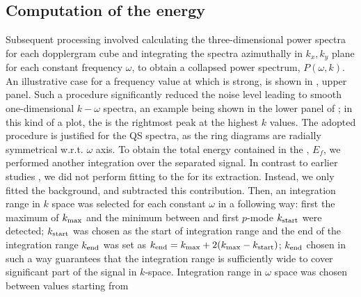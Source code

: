 \documentclass{aa}
\begin{document}
%
\subsection{Computation of the \fff 
energy}

Subsequent processing involved calculating the 
three-dimensional
power spectra for each dopplergram cube and 
integrating
the spectra azimuthally in $k_x, k_y$ plane for each constant frequency $\omega$,
to obtain a collapsed power spectrum, $P(\omega,k)$. An illustrative case for a frequency
value at which \fff is strong, is shown in 
,
upper panel.
Such a procedure
significantly reduced the noise level leading to smooth one-dimensional $k-\omega$ spectra,
an example being shown in the lower panel of ;
in this kind of a plot, the \fff is the rightmost peak at the highest $k$ values.
The adopted procedure
is justified for the 
QS
spectra, as the ring diagrams are radially symmetrical w.r.t. $\omega$ axis. 
To obtain the total energy contained in the \fff, $E_f$, we
performed another integration over the separated \fff signal.
In contrast to earlier studies \citep{SRB16,Waidele22}, we
did not perform fitting to the \fff for its extraction. 
Instead, we only fitted the background, and subtracted this 
contribution.
Then,
an integration range in $k$ space was selected for each constant $\omega$ in a following way: first the maximum of \fff $k_{\rm max}$ and the minimum between \fff and first $p$-mode $k_{\rm start}$ were detected; $k_{\rm start}$ was chosen as the start of integration range and the end of the integration range $k_{\rm end}$ was set as $k_{\rm end}=k_{\rm max}+2(k_{\rm max}-k_{\rm start})$; $k_{\rm end}$ chosen in such a way guarantees that the integration range is sufficiently wide to cover significant part of the \fff 
signal in $k$-space.
Integration range in $\omega$ space was chosen between values starting from 
\end{document}
